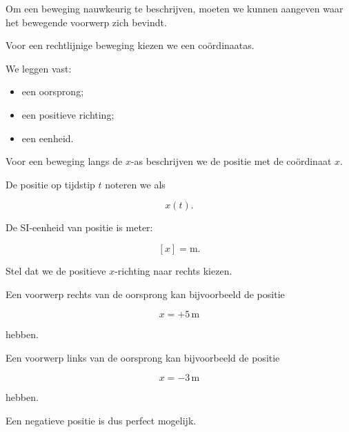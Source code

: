 \documentclass{ximera}
\begin{document}


Om een beweging nauwkeurig te beschrijven, moeten we kunnen aangeven
waar het bewegende voorwerp zich bevindt.

Voor een rechtlijnige beweging kiezen we een coördinaatas.

We leggen vast:

\begin{itemize}
  \item een oorsprong;
  \item een positieve richting;
  \item een eenheid.
\end{itemize}

Voor een beweging langs de $x$-as beschrijven we de positie met de
coördinaat $x$.

De positie op tijdstip $t$ noteren we als

\[
\boxed{x(t)}.
\]

De SI-eenheid van positie is meter:

\[
[x]=\mathrm{m}.
\]



Stel dat we de positieve $x$-richting naar rechts kiezen.

Een voorwerp rechts van de oorsprong kan bijvoorbeeld de positie

\[
x=+5\,\mathrm{m}
\]

hebben.

Een voorwerp links van de oorsprong kan bijvoorbeeld de positie

\[
x=-3\,\mathrm{m}
\]

hebben.

Een negatieve positie is dus perfect mogelijk.
\end{document}
